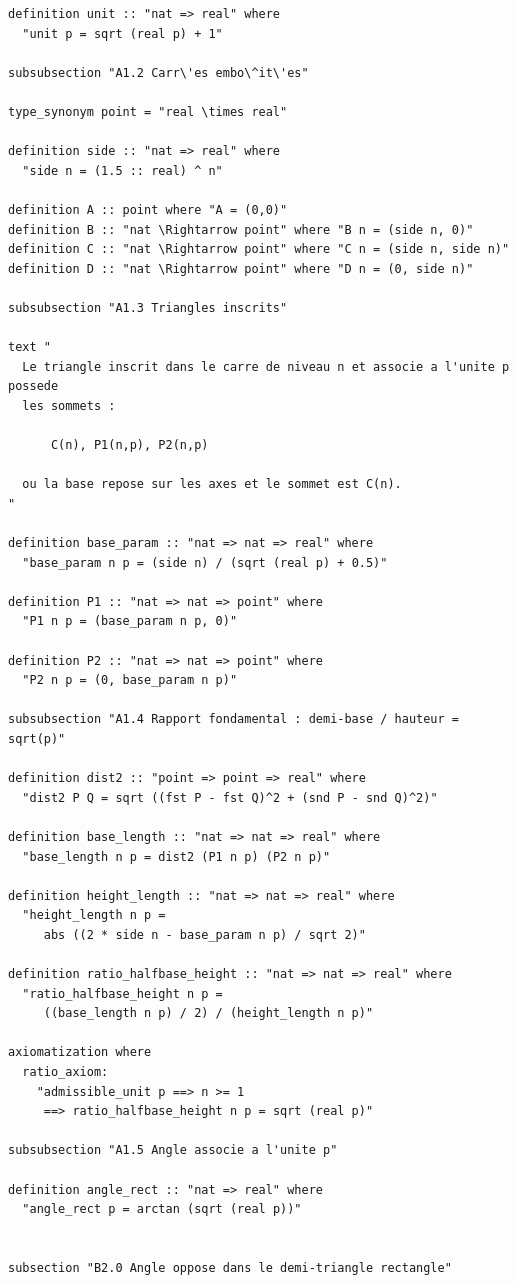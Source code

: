 \documentclass[12pt,a4paper]{article}
\begin{document}
\begin{verbatim}
definition unit :: "nat => real" where
  "unit p = sqrt (real p) + 1"

subsubsection "A1.2 Carr\'es embo\^it\'es"

type_synonym point = "real \times real"

definition side :: "nat => real" where
  "side n = (1.5 :: real) ^ n"

definition A :: point where "A = (0,0)"
definition B :: "nat \Rightarrow point" where "B n = (side n, 0)"
definition C :: "nat \Rightarrow point" where "C n = (side n, side n)"
definition D :: "nat \Rightarrow point" where "D n = (0, side n)"

subsubsection "A1.3 Triangles inscrits"

text "
  Le triangle inscrit dans le carre de niveau n et associe a l'unite p possede
  les sommets :

      C(n), P1(n,p), P2(n,p)

  ou la base repose sur les axes et le sommet est C(n).
"

definition base_param :: "nat => nat => real" where
  "base_param n p = (side n) / (sqrt (real p) + 0.5)"

definition P1 :: "nat => nat => point" where
  "P1 n p = (base_param n p, 0)"

definition P2 :: "nat => nat => point" where
  "P2 n p = (0, base_param n p)"

subsubsection "A1.4 Rapport fondamental : demi-base / hauteur = sqrt(p)"

definition dist2 :: "point => point => real" where
  "dist2 P Q = sqrt ((fst P - fst Q)^2 + (snd P - snd Q)^2)"

definition base_length :: "nat => nat => real" where
  "base_length n p = dist2 (P1 n p) (P2 n p)"

definition height_length :: "nat => nat => real" where
  "height_length n p =
     abs ((2 * side n - base_param n p) / sqrt 2)"

definition ratio_halfbase_height :: "nat => nat => real" where
  "ratio_halfbase_height n p =
     ((base_length n p) / 2) / (height_length n p)"

axiomatization where
  ratio_axiom:
    "admissible_unit p ==> n >= 1
     ==> ratio_halfbase_height n p = sqrt (real p)"

subsubsection "A1.5 Angle associe a l'unite p"

definition angle_rect :: "nat => real" where
  "angle_rect p = arctan (sqrt (real p))"


subsection "B2.0 Angle oppose dans le demi-triangle rectangle"


\end{verbatim}
\end{document}
